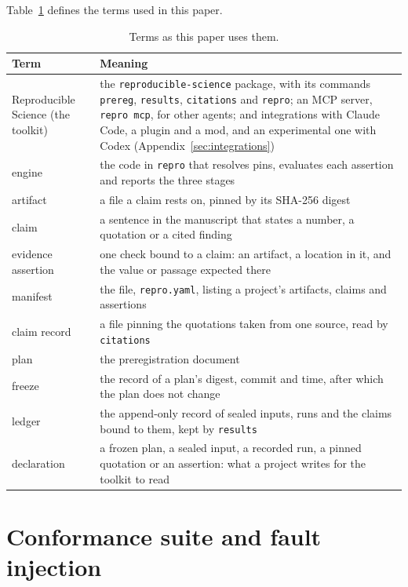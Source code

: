 \documentclass{article}
\newcommand{\code}[1]{\texttt{#1}}
\newcommand{\prereg}{\code{prereg}}
\newcommand{\results}{\code{results}}
\newcommand{\citations}{\code{citations}}
\newcommand{\repro}{\code{repro}}
\begin{document}
Table~\ref{tab:terms} defines the terms used in this paper.

\begin{table}[H]
\centering
\small
\caption{Terms as this paper uses them.}
\label{tab:terms}
\begin{tabular}{@{}>{\raggedright\arraybackslash}p{}>{\raggedright\arraybackslash}p{}@{}}
\toprule
\textbf{Term} & \textbf{Meaning} \\
\midrule
Reproducible Science (the toolkit) & the \code{reproducible-science} package, with its commands \prereg{}, \results{}, \citations{} and \repro{}; an MCP server, \code{repro mcp}, for other agents; and integrations with Claude Code, a plugin and a mod, and an experimental one with Codex (Appendix~\ref{sec:integrations}) \\
engine & the code in \repro{} that resolves pins, evaluates each assertion and reports the three stages \\
artifact & a file a claim rests on, pinned by its SHA-256 digest \\
claim & a sentence in the manuscript that states a number, a quotation or a cited finding \\
evidence assertion & one check bound to a claim: an artifact, a location in it, and the value or passage expected there \\
manifest & the file, \code{repro.yaml}, listing a project's artifacts, claims and assertions \\
claim record & a file pinning the quotations taken from one source, read by \citations{} \\
plan & the preregistration document \\
freeze & the record of a plan's digest, commit and time, after which the plan does not change \\
ledger & the append-only record of sealed inputs, runs and the claims bound to them, kept by \results{} \\
declaration & a frozen plan, a sealed input, a recorded run, a pinned quotation or an assertion: what a project writes for the toolkit to read \\
\bottomrule
\end{tabular}
\end{table}

\section{Conformance suite and fault injection}
\label{sec:suite}
\end{document}
